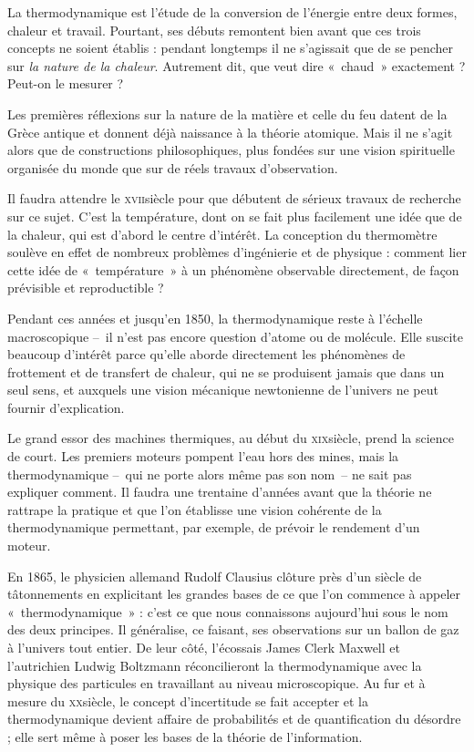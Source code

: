 La thermodynamique est l’étude de la conversion de l’énergie entre deux formes, chaleur et travail. Pourtant, ses débuts remontent bien avant que ces trois concepts ne soient établis : pendant longtemps il ne s’agissait que de se pencher sur \emph{la nature de la chaleur}. Autrement dit, que veut dire «~chaud~» exactement ? Peut-on le mesurer ?

Les premières réflexions sur la nature de la matière et celle du feu datent de la Grèce antique et donnent déjà naissance à la théorie atomique. Mais il ne s’agit alors que de constructions philosophiques, plus fondées sur une vision spirituelle organisée du monde que sur de réels travaux d’observation.

Il faudra attendre le \textsc{xvii}\ieme siècle pour que débutent de sérieux travaux de recherche sur ce sujet. C’est la température, dont on se fait plus facilement une idée que de la chaleur, qui est d’abord le centre  d’intérêt. La conception du thermomètre soulève en effet de nombreux problèmes d’ingénierie et de physique : comment lier cette idée de «~température~» à un phénomène observable directement, de façon prévisible et reproductible ?

Pendant ces années et jusqu’en 1850, la thermodynamique reste à l’échelle macroscopique –~il n’est pas encore question d’atome ou de molécule. Elle suscite beaucoup d’intérêt parce qu’elle aborde directement les phénomènes de frottement et de transfert de chaleur, qui ne se produisent jamais que dans un seul sens, et auxquels une vision mécanique newtonienne de l’univers ne peut fournir d’explication.

Le grand essor des machines thermiques, au début du \textsc{xix}\ieme siècle, prend la science de court. Les premiers moteurs pompent l’eau hors des mines, mais la thermodynamique –\ qui ne porte alors même pas son nom\ – ne sait pas expliquer comment. Il faudra une trentaine d’années avant que la théorie ne rattrape la pratique et que l’on établisse une vision cohérente de la thermodynamique permettant, par exemple, de prévoir le rendement d’un moteur.

En 1865, le physicien allemand Rudolf Clausius clôture près d’un siècle de tâtonnements en explicitant les grandes bases de ce que l’on commence à appeler «~thermodynamique~» : c’est ce que nous connaissons aujourd’hui sous le nom des deux principes. Il généralise, ce faisant, ses observations sur un ballon de gaz à l’univers tout entier. 
De leur côté, l’écossais James Clerk Maxwell et l’autrichien Ludwig Boltzmann réconcilieront la thermodynamique avec la physique des particules en travaillant au niveau microscopique. Au fur et à mesure du \textsc{xx}\ieme siècle, le concept d’incertitude se fait accepter et la thermodynamique devient affaire de probabilités et de quantification du désordre ; elle sert même à poser les bases de la théorie de l’information.

